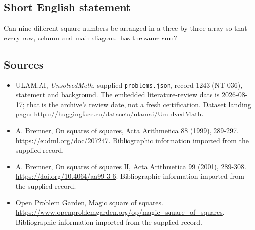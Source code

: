 \documentclass[11pt,a4paper]{article}
\begin{document}
\subsection{Short English statement}

Can nine different square numbers be arranged in a three-by-three array so that every row, column and main diagonal has the same sum?

\subsection{Sources}

{\small

\begin{itemize}

\item[\hypertarget{source:1243:1}{S1}] ULAM.AI, \emph{UnsolvedMath}, supplied \texttt{problems.json}, record 1243 (NT-036), statement and background. The embedded literature-review date is 2026-08-17; that is the archive’s review date, not a fresh certification. Dataset landing page: \url{https://huggingface.co/datasets/ulamai/UnsolvedMath}.

\item[\hypertarget{source:1243:2}{S2}] A. Bremner, On squares of squares, Acta Arithmetica 88 (1999), 289-297. \url{https://eudml.org/doc/207247}. Bibliographic information imported from the supplied record.

\item[\hypertarget{source:1243:3}{S3}] A. Bremner, On squares of squares II, Acta Arithmetica 99 (2001), 289-308. \url{https://doi.org/10.4064/aa99-3-6}. Bibliographic information imported from the supplied record.

\item[\hypertarget{source:1243:4}{S4}] Open Problem Garden, Magic square of squares. \url{https://www.openproblemgarden.org/op/magic_square_of_squares}. Bibliographic information imported from the supplied record.

\end{itemize}

}

\label{end:1243}
\end{document}
